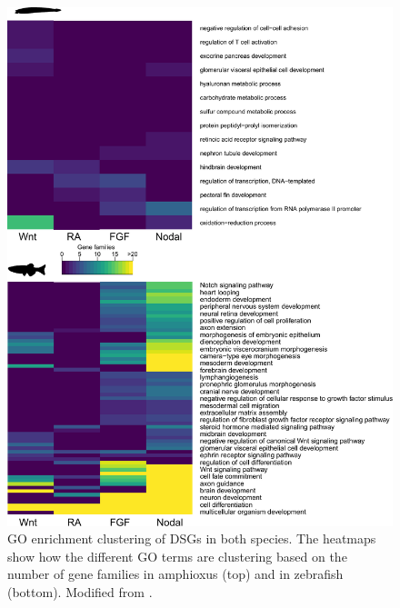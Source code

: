  
 
 
\begin{figure}[hp]
\centering
\includegraphics[width=1\textwidth]{Figures/DSG_GOs_fams}
\caption[GO enrichment clustering of DSGs in both species, using families]{GO enrichment clustering of DSGs in both species. The heatmaps show how the different GO terms are clustering based on the number of gene families in amphioxus (top) and in zebrafish (bottom). Modified from \parencite{gil-galvez_gain_2022}.
}
\label{fig:DGS_GOs_fams}
\end{figure} 

